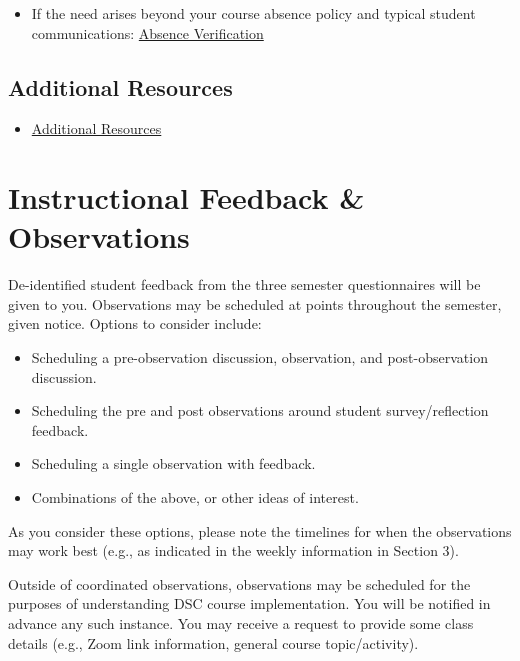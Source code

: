 \documentclass[
]{book}
\providecommand{\tightlist}{%
  \setlength{\itemsep}{0pt}\setlength{\parskip}{0pt}}
\begin{document}
\begin{itemize}
\tightlist
\item
  If the need arises beyond your course absence policy and typical student communications: \href{https://dasa.ncsu.edu/support-and-advocacy/find-help/absence-notification/}{Absence Verification}
\end{itemize}

\hypertarget{additional-resources}{%
\section{Additional Resources}\label{additional-resources}}

\begin{itemize}
\tightlist
\item
  \href{https://docs.google.com/document/d/1XHivvQ13iZ-qqvm77h7R1OTw4cIv1VwA/edit?usp=sharing\&ouid=112414287104912137071\&rtpof=true\&sd=true}{Additional Resources}
\end{itemize}

\hypertarget{instructional-feedback-observations}{%
\chapter{Instructional Feedback \& Observations}\label{instructional-feedback-observations}}

De-identified student feedback from the three semester questionnaires will be given to you. Observations may be scheduled at points throughout the semester, given notice. Options to consider include:

\begin{itemize}
\tightlist
\item
  Scheduling a pre-observation discussion, observation, and post-observation discussion.
\item
  Scheduling the pre and post observations around student survey/reflection feedback.
\item
  Scheduling a single observation with feedback.
\item
  Combinations of the above, or other ideas of interest.
\end{itemize}

As you consider these options, please note the timelines for when the observations may work best (e.g., as indicated in the weekly information in Section 3).

Outside of coordinated observations, observations may be scheduled for the purposes of understanding DSC course implementation. You will be notified in advance any such instance. You may receive a request to provide some class details (e.g., Zoom link information, general course topic/activity).
\end{document}
